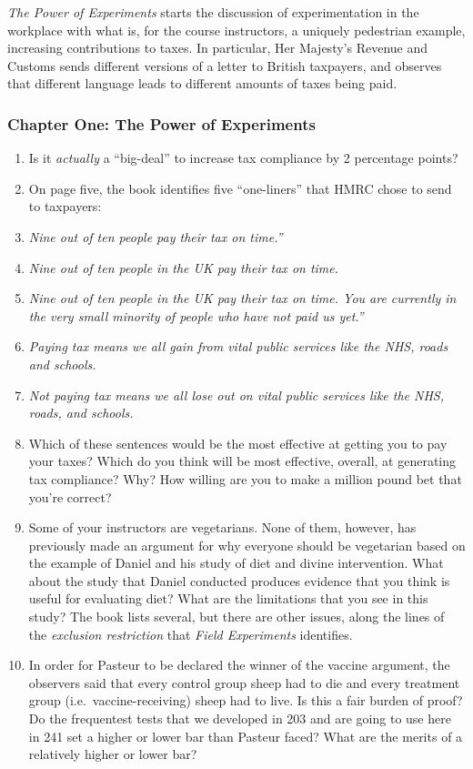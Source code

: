 \documentclass[
]{article}
\providecommand{\tightlist}{%
  \setlength{\itemsep}{0pt}\setlength{\parskip}{0pt}}
\begin{document}
\emph{The Power of Experiments} starts the discussion of experimentation in the workplace with what is, for the course instructors, a uniquely pedestrian example, increasing contributions to taxes. In particular, Her Majesty's Revenue and Customs sends different versions of a letter to British taxpayers, and observes that different language leads to different amounts of taxes being paid.

\hypertarget{chapter-one-the-power-of-experiments}{%
\subsubsection{Chapter One: The Power of Experiments}\label{chapter-one-the-power-of-experiments}}

\begin{enumerate}
\def\labelenumi{\arabic{enumi}.}
\tightlist
\item
  Is it \emph{actually} a ``big-deal'' to increase tax compliance by 2 percentage points?
\item
  On page five, the book identifies five ``one-liners'' that HMRC chose to send to taxpayers:
\item
  \emph{Nine out of ten people pay their tax on time.''}
\item
  \emph{Nine out of ten people in the UK pay their tax on time.}
\item
  \emph{Nine out of ten people in the UK pay their tax on time. You are currently in the very small minority of people who have not paid us yet.''}
\item
  \emph{Paying tax means we all gain from vital public services like the NHS, roads and schools.}
\item
  \emph{Not paying tax means we all lose out on vital public services like the NHS, roads, and schools.}
\item
  Which of these sentences would be the most effective at getting you to pay your taxes? Which do you think will be most effective, overall, at generating tax compliance? Why? How willing are you to make a million pound bet that you're correct?
\item
  Some of your instructors are vegetarians. None of them, however, has previously made an argument for why everyone should be vegetarian based on the example of Daniel and his study of diet and divine intervention. What about the study that Daniel conducted produces evidence that you think is useful for evaluating diet? What are the limitations that you see in this study? The book lists several, but there are other issues, along the lines of the \emph{exclusion restriction} that \emph{Field Experiments} identifies.
\item
  In order for Pasteur to be declared the winner of the vaccine argument, the observers said that every control group sheep had to die and every treatment group (i.e.~vaccine-receiving) sheep had to live. Is this a fair burden of proof? Do the frequentest tests that we developed in 203 and are going to use here in 241 set a higher or lower bar than Pasteur faced? What are the merits of a relatively higher or lower bar?
\end{enumerate}
\end{document}
